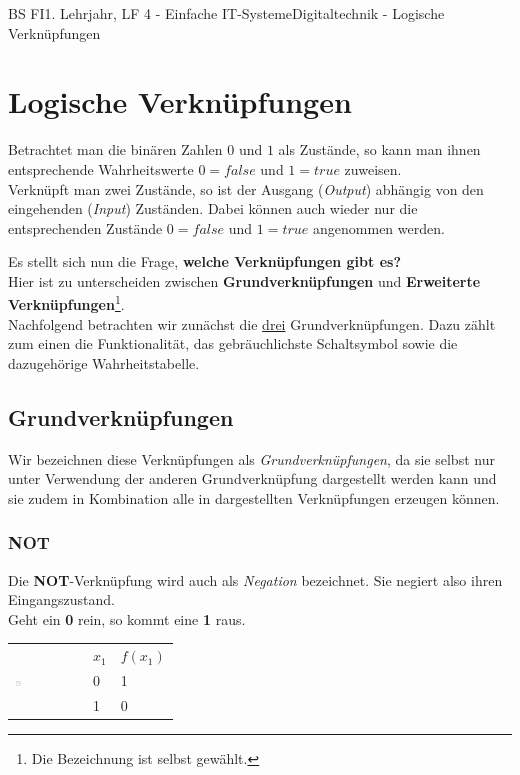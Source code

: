 \documentclass[11pt,twocolumn,oneside,openany,headings=optiontotoc,11pt,numbers=noenddot]{article}
\begin{document}
	\begin{worksheet}{BS FI}{1. Lehrjahr, LF 4 - Einfache IT-Systeme}{Digitaltechnik - Logische Verknüpfungen}
		\section{Logische Verknüpfungen}
		Betrachtet man die binären Zahlen \(0\) und \(1\) als Zustände, so kann man ihnen entsprechende Wahrheitswerte \(0 = false\) und \(1 = true\) zuweisen.\\
		Verknüpft man zwei Zustände, so ist der Ausgang (\textit{Output}) abhängig von den eingehenden (\textit{Input}) Zuständen. Dabei können auch wieder nur die entsprechenden Zustände \(0 = false\) und \(1 = true\) angenommen werden.\\
		\par\noindent
		Es stellt sich nun die Frage, \textbf{welche Verknüpfungen gibt es?}\\
		Hier ist zu unterscheiden zwischen \textbf{Grundverknüpfungen} und \textbf{Erweiterte Verknüpfungen}\footnote{Die Bezeichnung ist selbst gewählt.}.\\
		Nachfolgend betrachten wir zunächst die \underline{drei} Grundverknüpfungen. Dazu zählt zum einen die Funktionalität, das gebräuchlichste Schaltsymbol sowie die dazugehörige Wahrheitstabelle.
		\subsection{Grundverknüpfungen}
		Wir bezeichnen diese Verknüpfungen als \textit{Grundverknüpfungen}, da sie selbst nur unter Verwendung der anderen Grundverknüpfung dargestellt werden kann und sie zudem in Kombination alle in \textit{} dargestellten Verknüpfungen erzeugen können.
		\subsubsection*{NOT}
		Die \textbf{NOT}-Verknüpfung wird auch als \textit{Negation} bezeichnet. Sie negiert also ihren Eingangszustand.\\
		Geht ein \textbf{0} rein, so kommt eine \textbf{1} raus.
		\par\noindent
		\begin{tabularx}{0.48\textwidth}{ll|l}
			\multirow{3}{*}{\includegraphics[width=0.1\textwidth,align=t]{../99_Bilder/NOT.jpg}} & \(x_1\) & \(f(x_1)\)\\
			\cline{2-3}
			 & 0 & 1\\
			& 1 & 0\\
		\end{tabularx}

\end{worksheet}
\end{document}
